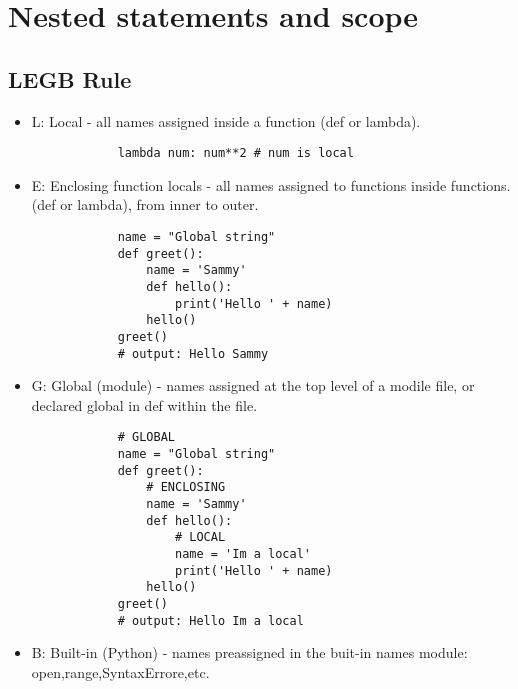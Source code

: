 \section{Nested statements and scope}
\subsection{LEGB Rule}
\begin{itemize}
    \item L: Local - all names assigned inside a function (def or lambda).
        \begin{verbatim}
            lambda num: num**2 # num is local
        \end{verbatim}
    \item E: Enclosing function locals - all names assigned to functions inside functions. (def or lambda), from inner to outer.  
        \begin{verbatim}
            name = "Global string"
            def greet():
                name = 'Sammy'
                def hello():
                    print('Hello ' + name)
                hello()
            greet()
            # output: Hello Sammy
        \end{verbatim}
    \item G: Global (module) - names assigned at the top level of a modile file, or declared global in def within the file.
        \begin{verbatim}
            # GLOBAL
            name = "Global string"
            def greet():
                # ENCLOSING 
                name = 'Sammy'
                def hello():
                    # LOCAL
                    name = 'Im a local'
                    print('Hello ' + name)
                hello()
            greet()
            # output: Hello Im a local
        \end{verbatim}
    \item B: Built-in (Python) - names preassigned in the buit-in names module: open,range,SyntaxErrore,etc.
\end{itemize}

